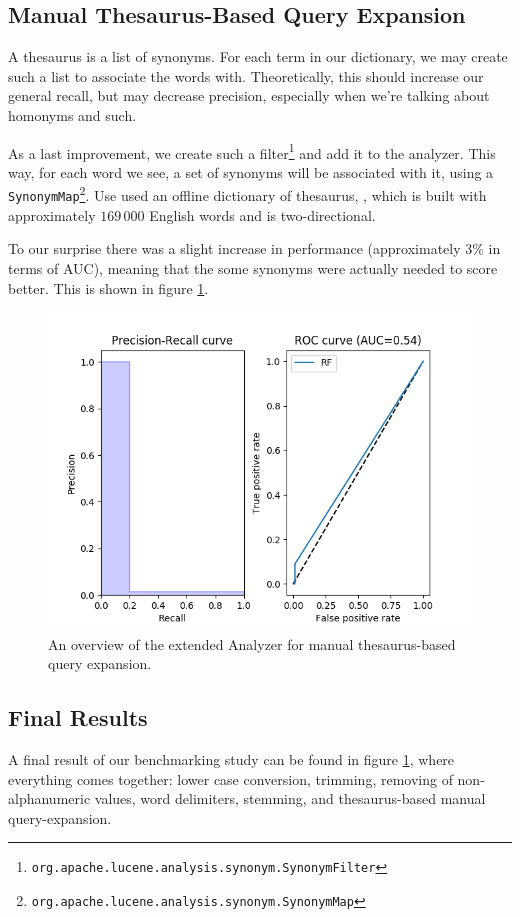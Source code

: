 \documentclass[11pt]{article}
\begin{document}
\subsection{Manual Thesaurus-Based Query Expansion}\label{sec:synonyms}
A thesaurus is a list of synonyms. For each term in our dictionary, we may create such a list to associate the words with. Theoretically, this should increase our general recall, but may decrease precision, especially when we're talking about homonyms and such.

As a last improvement, we create such a filter\footnote{\texttt{org.apache.lucene.analysis.synonym.SynonymFilter}} and add it to the analyzer. This way, for each word we see, a set of synonyms will be associated with it, using a \texttt{SynonymMap}\footnote{\texttt{org.apache.lucene.analysis.synonym.SynonymMap}}. Use used an offline dictionary of thesaurus, \cite{synonyms}, which is built with approximately $169\,000$ English words and is two-directional.

To our surprise there was a slight increase in performance (approximately 3\% in terms of AUC), meaning that the some synonyms were actually needed to score better. This is shown in figure \ref{fig:synonyms}.
\begin{figure}[htp]
	\centering
	\includegraphics[width=\textwidth]{images/customAna-synonym}
	\caption{An overview of the extended Analyzer for manual thesaurus-based query expansion.}
	\label{fig:synonyms}
\end{figure}


\subsection{Final Results}
A final result of our benchmarking study can be found in figure \ref{fig:synonyms}, where everything comes together: lower case conversion, trimming, removing of non-alphanumeric values, word delimiters, stemming, and thesaurus-based manual query-expansion.
\end{document}
